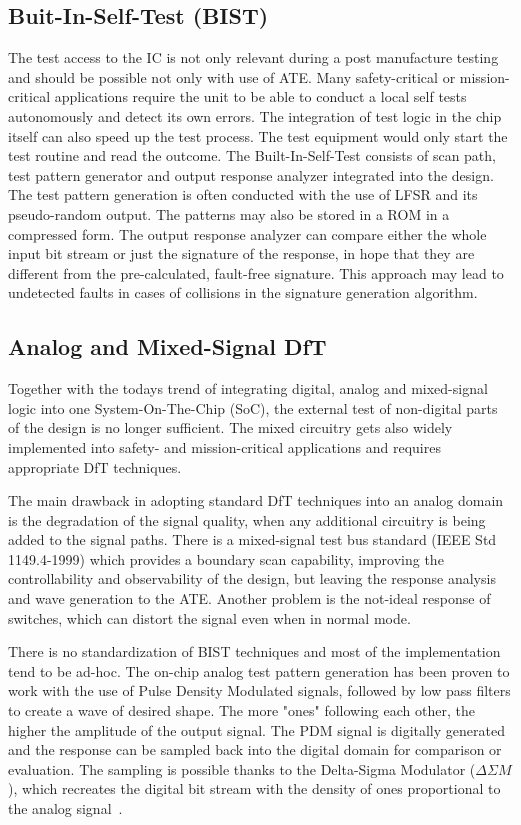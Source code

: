\subsection{Buit-In-Self-Test (BIST)}
The test access to the IC is not only relevant during a post manufacture testing and should be possible not only with use of ATE. Many safety-critical or mission-critical applications require the unit to be able to conduct a local self tests autonomously and detect its own errors. The integration of test logic in the chip itself can also speed up the test process. The test equipment would only start the test routine and read the outcome. The Built-In-Self-Test consists of scan path, test pattern generator and output response analyzer integrated into the design. The test pattern generation is often conducted with the use of LFSR and its pseudo-random output. The patterns may also be stored in a ROM in a compressed form. The output response analyzer can compare either the whole input bit stream or just the signature of the response, in hope that they are different from the pre-calculated, fault-free signature. This approach may lead to undetected faults in cases of collisions in the signature generation algorithm.


\subsection{Analog and Mixed-Signal DfT}\label{sub:testa}
Together with the todays trend of integrating digital, analog and mixed-signal logic into one System-On-The-Chip (SoC), the external test of non-digital parts of the design is no longer sufficient. The mixed circuitry gets also widely implemented into safety- and mission-critical applications and requires appropriate DfT techniques.

The main drawback in adopting standard DfT techniques into an analog domain is the degradation of the signal quality, when any additional circuitry is being added to the signal paths. There is a mixed-signal test bus standard (IEEE Std 1149.4-1999) which provides a boundary scan capability, improving the controllability and observability of the design, but leaving the response analysis and wave generation to the ATE. Another problem is the not-ideal response of switches, which can distort the signal even when in normal mode.

There is no standardization of BIST techniques and most of the implementation tend to be ad-hoc. The on-chip analog test pattern generation has been proven to work with the use of Pulse Density Modulated signals, followed by low pass filters to create a wave of desired shape. The more "ones" following each other, the higher the amplitude of the output signal. The PDM signal is digitally generated and the response can be sampled back into the digital domain for comparison or evaluation. The sampling is possible thanks to the Delta-Sigma Modulator ($\Delta \Sigma M$), which recreates the digital bit stream with the density of ones proportional to the analog signal~\cite{book:Grout}.

